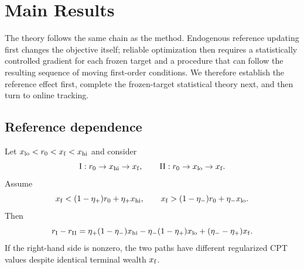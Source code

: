 \section{Main Results}\label{sec:results}

The theory follows the same chain as the method.  Endogenous reference updating first changes the objective itself; reliable optimization then requires a statistically controlled gradient for each frozen target and a procedure that can follow the resulting sequence of moving first-order conditions.  We therefore establish the reference effect first, complete the frozen-target statistical theory next, and then turn to online tracking.

\subsection{Reference dependence}

\begin{proposition}\label{prop:path-dependence}
Let $x_{\rm lo}<r_0<x_{\rm f}<x_{\rm hi}$ and consider
\[
 \mathrm{I}: r_0\to x_{\rm hi}\to x_{\rm f},
 \qquad
 \mathrm{II}: r_0\to x_{\rm lo}\to x_{\rm f}.
\]
Assume
\[
 x_{\rm f}<(1-\eta_{+})r_0+\eta_{+} x_{\rm hi},
 \qquad
 x_{\rm f}>(1-\eta_{-})r_0+\eta_{-} x_{\rm lo}.
\]
Then
\begin{equation}\label{eq:path-reference-gap}
 r_{\rm I}-r_{\rm II}
 =\eta_{+}(1-\eta_{-})x_{\rm hi}
 -\eta_{-}(1-\eta_{+})x_{\rm lo}
 +(\eta_{-}-\eta_{+})x_{\rm f}.
\end{equation}
If the right-hand side is nonzero, the two paths have different regularized CPT values despite identical terminal wealth $x_{\rm f}$.
\end{proposition}

